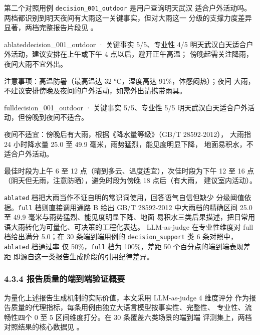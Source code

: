 第二个对照用例 \texttt{decision\_\bk{}001\_\bk{}outdoor} 是用户查询明天武汉
适合户外活动吗。两档都识别到明天夜间有大雨这一关键事实，但对大雨这一
分级的支撑力度差异显著，两档完整报告片段见 。

\begin{casebox}
    \caption{\texttt{decision\_\bk{}001\_\bk{}outdoor} 用例 \texttt{ablated} 档与 \texttt{full} 档报告片段对照}
    \label{case:outdoor-cmp}
    \begin{reportsnippet}{ablated}{decision\_\bk{}001\_\bk{}outdoor · 关键事实 5/5、专业性 4/5}
    明天武汉白天适合户外活动，建议安排在上午或下午 4 点以后，避开正午高温；
    傍晚起需关注降雨，夜间大雨不宜外出。

    注意事项：高温防暑（最高温达 32 °C，湿度高达 91\%，体感闷热）；夜间
    大雨，不建议安排傍晚及夜间的户外活动，如需外出请携带雨具。
    \end{reportsnippet}

    \begin{reportsnippet}{full}{decision\_\bk{}001\_\bk{}outdoor · 关键事实 5/5、专业性 5/5}
    明天武汉白天适合户外活动，但傍晚到夜间不适合。

    夜间不适宜：傍晚后有大雨，根据《降水量等级》（GB/T 28592-2012），
    大雨指 24 小时降水量 25.0 至 49.9 毫米，雨势猛烈，能见度明显下降，
    地面易积水，不适合户外活动。

    最佳时段为上午 6 至 12 点（晴到多云、温度适宜），次佳时段为下午
    12 至 16 点（阴天但无雨，注意防晒），避免时段为傍晚 18 点后（有大雨，
    建议室内活动）。
    \end{reportsnippet}
\end{casebox}

\texttt{ablated} 档把大雨当作不证自明的常识词使用，回答语气自信但缺少
分级阈值依据。\texttt{full} 档则直接调用通路 B 给出 GB/T 28592-2012
中大雨档的精确区间 25.0 至 49.9 毫米与雨势猛烈、能见度明显下降、地面
易积水三类后果描述，把日常用语大雨转化为可量化、可决策的工程化表达。
LLM-as-judge 在专业性维度对 full 档给出满分 5.0；在 30 条端到端用例的
\texttt{decision\_\bk{}support} 类 6 条对照中，\texttt{ablated} 档通过率
仅 50\%，\texttt{full} 档为 100\%，差距 50 个百分点的端到端表现差距
即源自这一类报告生成阶段的引用纪律差异。

\subsubsection*{4.3.4 \quad 报告质量的端到端验证概要}

为量化上述报告生成机制的实际价值，本文采用 LLM-as-judge 4 维度评分
作为报告质量的代理指标，每条用例由独立大语言模型按事实性、完整性、
专业性、流畅性四个 0 至 5 区间维度打分。在 30 条覆盖六类场景的端到端
评测集上，两档对照结果的核心数据见 。

